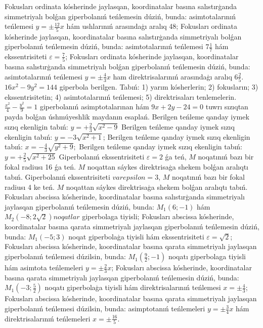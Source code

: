 Fokusları ordinata kósherinde jaylasqan, koordinatalar basına salıstırģanda simmetriyalı bolǵan giperbolanıń teńlemesin dúziń, bunda: asimtotalarınıń teńlemesi $y= \pm \frac{12}{5} x$ hám ushlarınıń arasındaģı aralıq 48;
Fokusları ordinata kósherinde jaylasqan, koordinatalar basına salıstırģanda simmetriyalı bolǵan giperbolanıń teńlemesin dúziń, bunda: asimtotalarınıń teńlemesi $7 \frac{1}{7}$ hám ekssentrisiteti $\varepsilon=\frac{7}{5}$;
Fokusları ordinata kósherinde jaylasqan, koordinatalar basına salıstırģanda simmetriyalı bolǵan giperbolanıń teńlemesin dúziń, bunda: asimtotalarınıń teńlemesi $y= \pm \frac{4}{3} x$ ham direktrisalarınıń arasındaģı aralıq $6 \frac{2}{5}$.
$16 x^2-9 y^2=144$ giperbola berilgen. Tabıń: 1) yarım kósherlerin; 2) fokusların; 3) ekssentrisitetin; 4) asimtotalarınıń teńlemesi; 5) direktrisaları tenlemelerin.
$\frac{x^2}{4}-\frac{y^2}{9}=1$ giperbolanıń asimptotalarınan hám $9 x+2 y-24=0$ tuwrı sızıqtan payda bolǵan úshmúyeshlik maydanın esaplań.
Berilgen teńleme qanday iymek sızıq ekenligin tabıń: $y=+\frac{2}{3} \sqrt{x^2-9}$
Berilgen teńleme qanday iymek sızıq ekenligin tabıń: $y=-3 \sqrt{x^2+1}$;
Berilgen teńleme qanday iymek sızıq ekenligin tabıń: $x=-\frac{4}{3} \sqrt{y^2+9} ;$
Berilgen teńleme qanday iymek sızıq ekenligin tabıń: $y=+\frac{2}{5} \sqrt{x^2+25}$
Giperbolanıń ekssentrisiteti $\varepsilon=2$ ǵa teń, $M$ noqatınıń bazı bir fokal radiusı 16 ǵa teń. $M$ noqattan sáykes direktrisaģa shekem bolǵan aralıqtı tabıń.
Giperbolanıń ekssentrisiteti $varepsilon=3$, $M$ noqatınıń bazı bir fokal radiusı 4 ke teń. $M$ noqattan sáykes direktrisaģa shekem bolǵan aralıqtı tabıń.
Fokusları abscissa kósherinde, koordinatalar basına salıstırģanda simmetriyalı jaylasqan giperbolanıń teńlemesin dúziń, bunda: $M_1 (6;-1) $ hám $M_2 (-8; 2 \sqrt{2}) noqatlar $ giperbolaga tiyisli;
Fokusları abscissa kósherinde, koordinatalar basına qarata simmetriyalı jaylasqan giperbolanıń teńlemesin dúziń, bunda: $M_1 (-5; 3)$ noqat giperbolaģa tiyisli hám ekssentrisiteti $\varepsilon=\sqrt{2}$;
Fokusları abscissa kósherinde, koordinatalar basına qarata simmetriyalı jaylasqan giperbolanıń teńlemesi dúzilsin, bunda: $M_1\left(\frac{9}{2};-1\right) $ noqatı giperbolaga tiyisli hám asimtota teńlemeleri $y= \pm \frac{2}{3} x$;
Fokusları abscissa kósherinde, koordinatalar basına qarata simmetriyalı jaylasqan giperbolanıń teńlemesin dúziń, bunda: $M_1\left(-3; \frac{5}{2}\right)$ noqatı giperbolaģa tiyisli hám direktrisalarınıń teńlemesi $x= \pm \frac{4}{3}$;
Fokusları abscissa kósherinde, koordinatalar basına qarata simmetriyalı jaylasqan giperbolanıń teńlemesi dúzilsin, bunda: asimptotanıń teńlemeleri $y= \pm \frac{3}{4} x$ hám direktrisalarınıń teńlemeleri $x= \pm \frac{16}{5}$.
